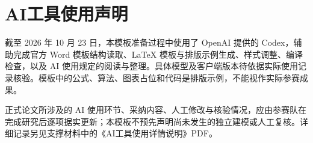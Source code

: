 \clearpage
\section*{AI工具使用声明}
{}
截至 2026 年 10 月 23 日，本模板准备过程中使用了 OpenAI 提供的 Codex，辅助完成官方 Word 模板结构读取、LaTeX 模板与排版示例生成、样式调整、编译检查，以及 AI 使用规定的阅读与整理。具体模型及客户端版本待依据实际使用记录核验。模板中的公式、算法、图表占位和代码是排版示例，不能视作实际参赛成果。

正式论文所涉及的 AI 使用环节、采纳内容、人工修改与核验情况，应由参赛队在完成研究后逐项据实更新；本模板不预先声明尚未发生的独立建模或人工复核。详细记录另见支撑材料中的《AI工具使用详情说明》PDF。

